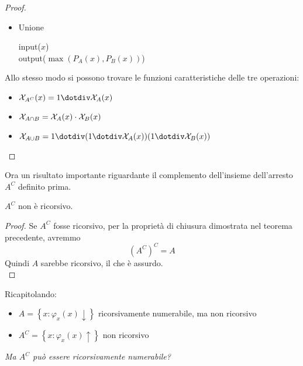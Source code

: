\begin{proof}
\begin{itemize}
	\item Unione
	\begin{center}
		\begin{minipage}{.5\textwidth}
			\begin{tcolorbox}[
				colback=white,
				sharp corners,
				boxrule=.3mm,
				left=20pt,
				top=0pt,
				bottom=0pt,
				colbacktitle=white,
				coltitle=black
				]
				\begin{algorithm}[H]
					\SetAlgoNoEnd
					input($x$) \\
					output($\max (P_A (x), P_B (x))$)
				\end{algorithm}
			\end{tcolorbox}
		\end{minipage}
	\end{center}
	\end{itemize}

	Allo stesso modo si possono trovare le funzioni caratteristiche delle tre operazioni:
	\begin{itemize}
		\item $\X_{A^C} (x) = 1 \dotminus \X_A (x)$
		
        \item $\mathcal{X}_{A \cap B} = \mathcal{X}_A (x) \cdot \mathcal{X}_B (x)$
		
        \item $\X_{A \cup B} = 1 \dotminus (1 \dotminus \X_A (x)) (1 \dotminus \X_B (x))$
	\end{itemize}
\end{proof}

Ora un risultato importante riguardante il complemento dell'insieme dell'arresto $A^C$ definito prima.\\

\begin{theor}
	$A^C$ non è ricorsivo.
\end{theor}
\begin{proof}
	Se $A^C$ fosse ricorsivo, per la proprietà di chiusura dimostrata nel teorema precedente, avremmo
	$$ \left(A^C\right)^C = A $$
	Quindi $A$ sarebbe ricorsivo, il che è assurdo. \\
\end{proof}

Ricapitolando:
\begin{itemize}
	\item $A = \left\{x: \varphi_x (x) \downarrow\right\}$ ricorsivamente numerabile, ma non ricorsivo
	
    \item $A^C = \left\{x: \varphi_x (x) \uparrow\right\}$ non ricorsivo
\end{itemize}
\textit{Ma $A^C$ può essere ricorsivamente numerabile?}\\

